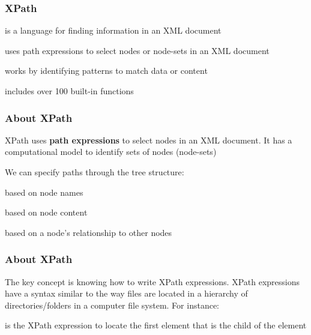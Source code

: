 \documentclass[12pt]{beamer}\usepackage[]{graphicx}\usepackage[]{color}
\begin{document}

\begin{frame}
\frametitle{XPath}

\bi
 \item is a language for finding information in an XML document
 \item uses path expressions to select nodes or node-sets in an XML document
 \item works by identifying patterns to match data or content
 \item includes over 100 built-in functions
\ei
\eb

\end{frame}


\begin{frame}
\frametitle{About XPath}

XPath uses \textbf{path expressions} to select nodes in an XML document. It has a computational model to identify sets of nodes (node-sets)
\eb

We can specify paths through the tree structure:
\bi
 \item based on node names
 \item based on node content
 \item based on a node's relationship to other nodes
\ei
\eb

\end{frame}


\begin{frame}[fragile]
\frametitle{About XPath}

The key concept is knowing how to write XPath expressions. XPath expressions have a syntax similar to the way files are located in a hierarchy of directories/folders in a computer file system. For instance:
\eb

{\hilit {}}

\bigskip
is the XPath expression to locate the first {\hilit {}} element that is the child of the {\hilit {}} element

\end{frame}

\end{document}
